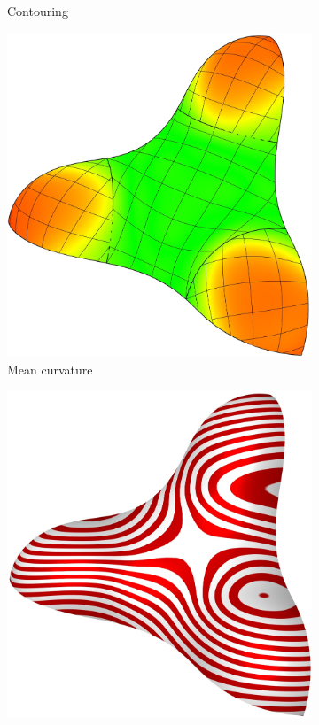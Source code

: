 \documentclass{article}
\begin{document}
\begin{figure}[h!]
\begin{subfigure}{0.23\textwidth}
    \caption{Contouring}
    \label{fig:trebol-contour}
  \end{subfigure}
  \begin{subfigure}{0.23\textwidth}
    \includegraphics[width = \textwidth]{images/trebol3-mean-iso.jpg}
    \caption{Mean curvature}
    \label{fig:trebol-mean}
  \end{subfigure}
  \begin{subfigure}{0.23\textwidth}
    \includegraphics[width = \textwidth]{images/trebol3-zebra.jpg}

\end{subfigure}
\end{figure}
\end{document}
